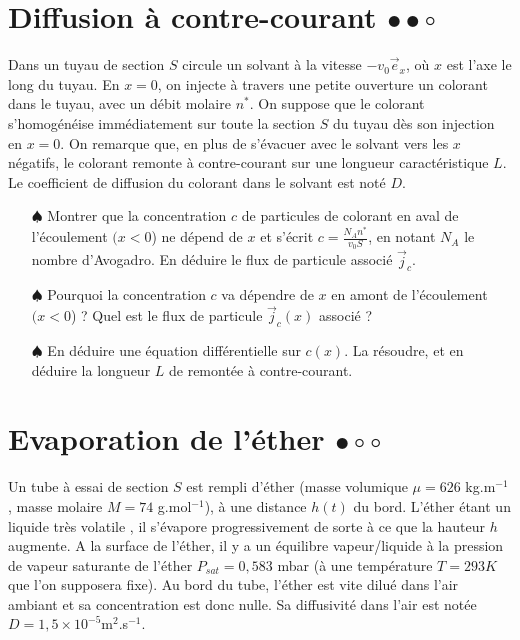 \documentclass{report}
\begin{document}
\newpage

\section*{Diffusion à contre-courant $\bullet\bullet\circ$}

Dans un tuyau de section $S$ circule un solvant à la vitesse $-v_0\vec{e}_x$, où $x$ est l'axe le long du tuyau. En $x=0$, on injecte à travers une petite ouverture un colorant dans le tuyau, avec un débit molaire $n^*$. On suppose que le colorant s'homogénéise immédiatement sur toute la section $S$ du tuyau dès son injection en $x=0$. On remarque que, en plus de s'évacuer avec le solvant vers les $x$ négatifs, le colorant remonte à contre-courant sur une longueur caractéristique $L$. Le coefficient de diffusion du colorant dans le solvant est noté $D$.

\begin{itemize}

	\item[$\spadesuit$] Montrer que la concentration $c$ de particules de colorant en aval de l'écoulement $(x<0$) ne dépend de $x$ et s'écrit $c=\frac{N_A n^*}{v_0S}$, en notant $N_A$ le nombre d'Avogadro. En déduire le flux de particule associé $\vec{j}_c$.
	
	\item[$\spadesuit$] Pourquoi la concentration $c$ va dépendre de $x$ en amont de l'écoulement $(x<0$) ? Quel est le flux de particule $\vec{j}_c(x)$ associé ?
	
	\item[$\spadesuit$] En déduire une équation différentielle sur $c(x)$. La résoudre, et en déduire la longueur $L$ de remontée à contre-courant.

\end{itemize}

\newpage

\section*{Evaporation de l'éther $\bullet\circ\circ$}

Un tube à essai de section $S$ est rempli d'éther (masse volumique $\mu=626$ kg.m$^{-1}$, masse molaire $M=74$ g.mol$^{-1}$), à une distance $h(t)$ du bord. L'éther étant un liquide très volatile , il s'évapore progressivement de sorte à ce que la hauteur $h$ augmente. A la surface de l'éther, il y a un équilibre vapeur/liquide à la pression de vapeur saturante de l'éther $P_{sat}=0,583$ mbar (à une température $T=293K$ que l'on supposera fixe). Au bord du tube, l'éther est vite dilué dans l'air ambiant et sa concentration est donc nulle. Sa diffusivité dans l'air est notée $D=1,5\times10^{-5}$m$^2$.s$^{-1}$.
\end{document}
